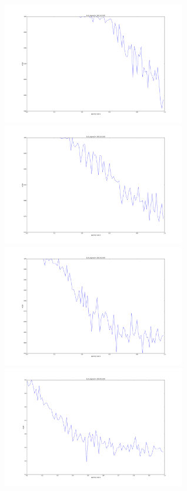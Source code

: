 \documentclass[letter, 10pt]{article}
\numberwithin{equation}{section}
\begin{document}
\begin{figure}
\centering 
\label{fig:1}
\includegraphics[width=8cm,keepaspectratio]{fig2/w_Norm_x_BerNorm_A_none_n100_k10_p__sigma0_00.png}
 \includegraphics[width=8cm,keepaspectratio]{fig2/w_Norm_x_BerNorm_A_none_n100_k20_p__sigma0_00.png}
\includegraphics[width=8cm,keepaspectratio]{fig2/w_Norm_x_BerNorm_A_none_n100_k30_p__sigma0_00.png}
\includegraphics[width=8cm,keepaspectratio]{fig2/w_Norm_x_BerNorm_A_none_n100_k40_p__sigma0_00.png}

\end{figure}
\end{document}
